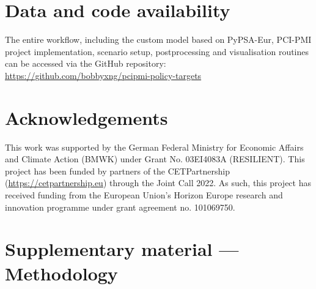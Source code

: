 \documentclass[preprint,12pt]{elsarticle}
\begin{document}
\section*{Data and code availability}
The entire workflow, including the custom model based on PyPSA-Eur, PCI-PMI project implementation, scenario setup, postprocessing and visualisation routines can be accessed via the GitHub repository: \newline 
\href{https://github.com/bobbyxng/pcipmi-policy-targets}{https://github.com/bobbyxng/pcipmi-policy-targets}

\section*{Acknowledgements}
This work was supported by the German Federal Ministry for Economic Affairs and Climate Action (BMWK) under Grant No. 03EI4083A (RESILIENT). This project has been funded by partners of the CETPartnership (\href{https://cetpartnership.eu}{https://cetpartnership.eu}) through the Joint Call 2022. As such, this project has received funding from the European Union's Horizon Europe research and innovation programme under grant agreement no. 101069750.


\newpage
\appendix
\section{Supplementary material --- Methodology}
\label{app:methodology}
\end{document}
